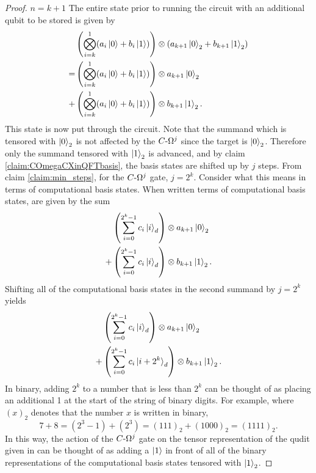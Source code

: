 \begin{proof}
    $n=k+1$\newline
    The entire state prior to running the circuit with an additional qubit to be stored is given by
    \begin{align}
        &\left(\bigotimes_{i = k}^{1}(a_i\ket{0} + b_i\ket{1})\right)\otimes(a_{k+1}\ket{0}_2 + b_{k+1}\ket{1}_2)\\
        =&\left(\bigotimes_{i = k}^{1}(a_i\ket{0} + b_i\ket{1})\right)\otimes a_{k+1}\ket{0}_2\label{eqn:first_summand}\\ 
        +
        &\left(\bigotimes_{i = k}^{1}(a_i\ket{0} + b_i\ket{1})\right)\otimes b_{k+1}\ket{1}_2. \label{eqn:second_summand}
    \end{align}
    This state is now put through the circuit.
    Note that the summand which is tensored with $\ket{0}_2$ is not affected by the $C\text{-}\Omega^j$ since the target is $\ket{0}_2$.
    Therefore only the summand tensored with $\ket{1}_2$ is advanced, and by claim \ref{claim:COmegaCXinQFTbasis}, the basis states are shifted up by $j$ steps.
    From claim \ref{claim:min_steps}, for the $C\text{-}\Omega^j$ gate, $j = 2^k$.
    Consider what this means in terms of computational basis states.
    When written terms of computational basis states,  are given by the sum
    \begin{align}
        &\left(\sum_{i=0}^{2^k - 1}c_i\ket{i}_d\right) \otimes a_{k+1}\ket{0}_2\\
        +&\left(\sum_{i=0}^{2^k - 1}c_i\ket{i}_d\right) \otimes b_{k+1}\ket{1}_2.
    \end{align}
    Shifting all of the computational basis states in the second summand by $j=2^k$ yields
    \begin{align}
        &\left(\sum_{i=0}^{2^k - 1}c_i\ket{i}_d\right) \otimes a_{k+1}\ket{0}_2\\
        +&\left(\sum_{i=0}^{2^k - 1}c_i\ket{i + 2^k}_d\right) \otimes b_{k+1}\ket{1}_2.
    \end{align}
    In binary, adding $2^k$ to a number that is less than $2^k$ can be thought of as placing an additional 1 at the start of the string of binary digits.
    For example, where $(x)_2$ denotes that the number $x$ is written in binary,
    \begin{equation}
        7 + 8 = (2^3 - 1) + (2^3) = (111)_2 + (1000)_2 = (1111)_2.
    \end{equation}
    In this way, the action of the $C\text{-}\Omega^j$ gate on the tensor representation of the qudit given in  can be thought of as adding a $\ket{1}$ in front of all of the binary representations of the computational basis states tensored with $\ket{1}_2$.

\end{proof}
